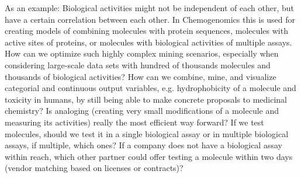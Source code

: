 \documentclass{sig-alternate}
\begin{document}
\begin{enumerate}
  As an example: Biological activities might not be independent of
  each other, but have a certain correlation between each other.  In
  Chemogenomics this is used for creating models of combining
  molecules with protein sequences, molecules with active sites of
  proteins, or molecules with biological activities of multiple
  assays. How can we optimize such highly complex mining scenarios,
  especially when considering large-scale data sets with hundred of
  thousands molecules and thousands of biological activities?  How can
  we combine, mine, and visualize categorial and continuous output
  variables, e.g. hydrophobicity of a molecule and toxicity in humans,
  by still being able to make concrete proposals to medicinal
  chemistry? Is analoging (creating very small modifications of a
  molecule and measuring its activities) really the most efficient way
  forward? If we test molecules, should we test it in a single
  biological assay or in multiple biological assays, if multiple,
  which ones?  If a company does not have a biological assay within
  reach, which other partner could offer testing a molecule within two
  days (vendor matching based on licenses or contracts)?
\end{enumerate} 
\end{document}
